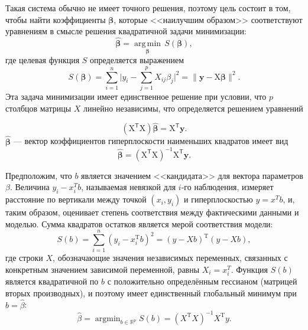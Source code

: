 Такая система обычно не имеет точного решения, поэтому цель состоит в том, чтобы найти коэффициенты $\boldsymbol{\beta}$, которые <<наилучшим образом>> соответствуют уравнениям в смысле решения квадратичной задачи минимизации:
\begin{equation}
\label{eq:ols_minimization}
\hat{\boldsymbol{\beta}} = {\underset{\boldsymbol{\beta}}{\operatorname{arg\,min}}}\,S({\boldsymbol{\beta}}),
\end{equation}
где целевая функция $S$ определяется выражением
\begin{equation}
\label{eq:ols_function}
S({\boldsymbol{\beta}}) = \sum_{i = 1}^{n}{\biggl|} y_{i} - \sum_{j = 1}^{p} X_{ij} \beta_{j} {\biggr|}^{2} = {\bigl\|} \mathbf{y} - \mathrm{X}{\boldsymbol{\beta}}{\bigr\|}^{2}.
\end{equation}
Эта задача минимизации имеет единственное решение при условии, что $p$ столбцов матрицы $X$ линейно независимы, что определяется решением уравнений

\begin{equation}
\label{eq:ols_normal_equations}
(\mathrm{X}^{\mathsf{T}}\mathrm{X}){\hat{\boldsymbol{\beta}}} = \mathrm{X}^{\mathsf{T}}\mathbf{y}.
\end{equation}
$\hat{\boldsymbol{\beta}}$ --- вектор коэффициентов гиперплоскости наименьших квадратов имеет вид
\begin{equation}
\label{eq:ols_betas}
{\hat{\boldsymbol{\beta}}} = \left(\mathrm{X}^{\mathsf{T}} \mathrm{X} \right)^{-1} \mathrm{X}^{\mathsf{T}} \mathbf{y}.
\end{equation}

Предположим, что $b$ является значением <<кандидата>> для вектора параметров $\beta$. Величина $y_i - x_i^T b$, называемая невязкой для $i$-го наблюдения, измеряет расстояние по вертикали между точкой $(x_i, y_i)$ и гиперплоскостью $y = x^T b$, и, таким образом, оценивает степень соответствия между фактическими данными и моделью. Сумма квадратов остатков является мерой соответствия модели:
\begin{equation}
\label{eq:ols_rss}
S(b) = \sum_{i = 1}^{n}(y_{i}-x_{i}^{\mathrm{T}}b)^{2} = (y-Xb)^{\mathrm{T}}(y-Xb),
\end{equation}
где строки $X$, обозначающие значения независимых переменных, связанных с конкретным значением зависимой переменной, равны $X_i = x_i^T$. Функция $S (b)$ является квадратичной по $b$ с положительно определённым гессианом (матрицей вторых производных), и поэтому имеет единственный глобальный минимум при $b ={\hat{\beta}}$:
\begin{equation}
\label{eq:ols_beta}
\hat{\beta} = \operatorname{argmin}_{b \in \mathbb{R}^{p}} S(b) = (X^{\mathrm {T}}X)^{-1} X^{\mathrm{T}}y.
\end{equation}

